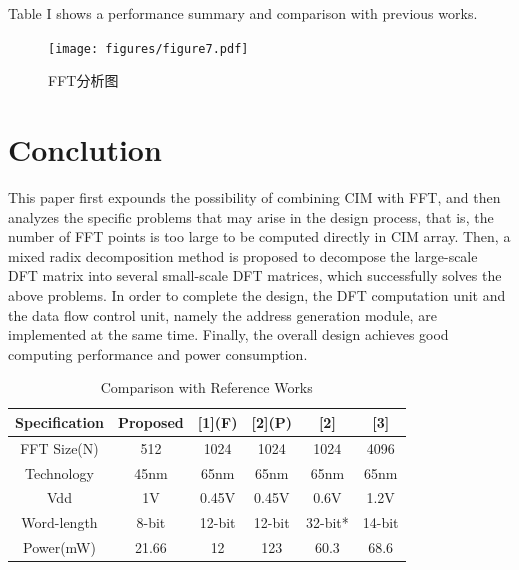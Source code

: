 \documentclass[journal]{IEEEtran}
\begin{document}
Table I shows a performance summary and comparison with previous works.


\begin{figure}[h]
\centering
\texttt{[image: figures/figure7.pdf]}
\caption{FFT分析图}
\end{figure}

\section{Conclution}
This paper first expounds the possibility of combining CIM with FFT, and then analyzes the specific problems that may arise in the design process, that is, the number of FFT points is too large to be computed directly in CIM array. Then, a mixed radix decomposition method is proposed to decompose the large-scale DFT matrix into several small-scale DFT matrices, which successfully solves the above problems. In order to complete the design, the DFT computation unit and the data flow control unit, namely the address generation module, are implemented at the same time\cite{4}. Finally, the overall design achieves good \cite{5} computing \cite{6} performance and power \cite{7} consumption.


\begin{table}[htbp]
\centering
\caption{Comparison with Reference Works}
\label{Tab I}
    \begin{tabular}{cccccc}
        \hline
        Specification &Proposed &[1](F) &[2](P) &[2]      &[3] \\
        \hline
        FFT Size(N)   &512      &1024   &1024   &1024     &4096   \\
        Technology    &45nm     &65nm   &65nm   &65nm     &65nm   \\
        Vdd           &1V       &0.45V  &0.45V  &0.6V     &1.2V   \\
        Word-length   &8-bit    &12-bit &12-bit &32-bit*  &14-bit  \\
        Power(mW)     &21.66    &12     &123    &60.3     &68.6    \\
        \hline
    \end{tabular}
\end{table}


\ifCLASSOPTIONcaptionsoff
  \newpage
\fi



\end{document}
